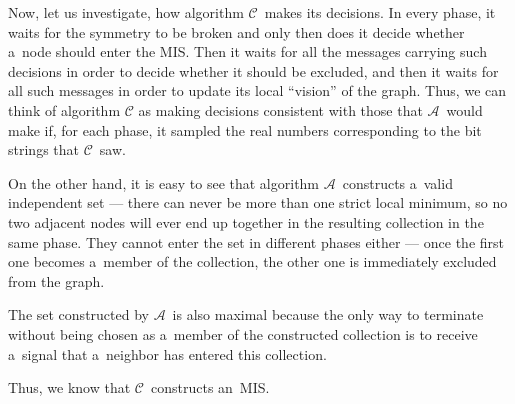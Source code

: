 \documentclass{article}
\begin{document}
 Now, let us investigate, how algorithm \(\mathcal{C}\)~makes its decisions. In every phase, it waits for the symmetry to be broken and only then does it decide whether a~node should enter the MIS. Then it waits for all the messages carrying such decisions in order to decide whether it should be excluded, and then it waits for all such messages in order to update its local ``vision'' of the graph. Thus, we can think of algorithm \(\mathcal{C}\) as making decisions consistent with those that \(\mathcal{A}\)~would make if, for each phase, it sampled the real numbers corresponding to the bit strings that \(\mathcal{C}\)~saw.

On the other hand, it is easy to see that algorithm \(\mathcal{A}\)~constructs a~valid independent set --- there can never be more than one strict local minimum, so no two adjacent nodes will ever end up together in the resulting collection in the same phase. They cannot enter the set in different phases either --- once the first one becomes a~member of the collection, the other one is immediately excluded from the graph. 

The set constructed by \(\mathcal{A}\)~is also maximal because the only way to terminate without being chosen as a~member of the constructed collection is to receive a~signal that a~neighbor has entered this collection.

Thus, we know that \(\mathcal{C}\)~constructs an~MIS.
\end{document}
